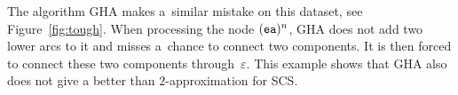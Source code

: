 \documentclass[11pt]{article}
\newenvironment{mypic}{\begin{center}\begin{tikzpicture}[>=latex,line width=.3mm]}{\end{tikzpicture}\end{center}}
\begin{document}
The algorithm GHA makes a~similar mistake on this dataset, see Figure~\ref{fig:tough}. When processing the node $({\tt ea})^n$, GHA does not add two lower arcs to it and misses a~chance to connect two components. It is then forced to connect these two components through~$\varepsilon$. This example shows that GHA also does not give a better than $2$-approximation for SCS.

%
%
% 
%
\end{document}
